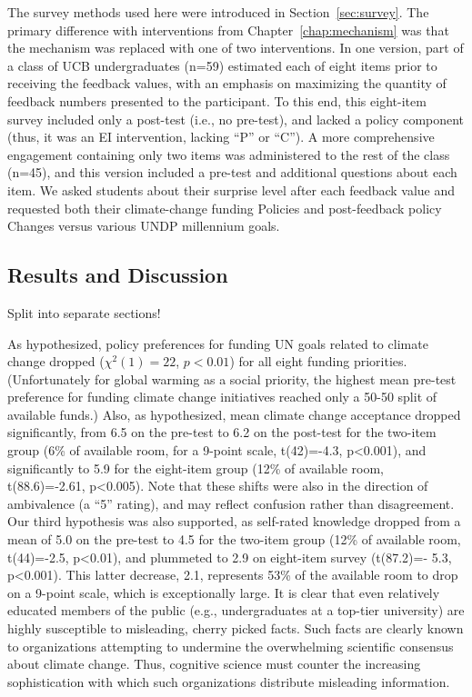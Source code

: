 The survey methods used here were introduced in Section~\ref{sec:survey}. The
primary difference with interventions from Chapter~\ref{chap:mechanism} was that
the mechanism was replaced with one of two interventions. In one version, part
of a class of UCB undergraduates (n=59) estimated each of eight items prior to
receiving the feedback values, with an emphasis on maximizing the quantity of
feedback numbers presented to the participant. To this end, this eight-item
survey included only a post-test (i.e., no pre-test), and lacked a policy
component (thus, it was an EI intervention, lacking ``P'' or ``C''). A more
comprehensive engagement containing only two items was administered to the rest
of the class (n=45), and this version included a pre-test and additional
questions about each item. We asked students about their surprise level after
each feedback value and requested both their climate-change funding Policies and
post-feedback policy Changes versus various UNDP millennium goals.

\subsection{Results and Discussion}

Split into separate sections! 

As hypothesized, policy preferences for funding UN goals
related to climate change dropped ($\chi^2(1)=22$, $p<0.01$) for all eight funding
priorities. (Unfortunately for global warming as a social priority, the highest
mean pre-test preference for funding climate change initiatives reached only a
50-50 split of available funds.) Also, as hypothesized, mean climate change
acceptance dropped significantly, from 6.5 on the pre-test to 6.2 on the
post-test for the two-item group (6\% of available room, for a 9-point scale,
t(42)=-4.3, p<0.001), and significantly to 5.9 for the eight-item group (12\% of
available room, t(88.6)=‑2.61, p<0.005). Note that these shifts were also in the
direction of ambivalence (a ``5'' rating), and may reflect confusion rather than
disagreement. Our third hypothesis was also supported, as self-rated knowledge
dropped from a mean of 5.0 on the pre-test to 4.5 for the two-item group (12\% of
available room, t(44)=-2.5, p<0.01), and plummeted to 2.9 on eight-item survey
(t(87.2)=- 5.3, p<0.001). This latter decrease, 2.1, represents 53\% of the
available room to drop on a 9-point scale, which is exceptionally large.  It is
clear that even relatively educated members of the public (e.g., undergraduates
at a top-tier university) are highly susceptible to misleading, cherry picked
facts. Such facts are clearly known to organizations attempting to undermine the
overwhelming scientific consensus about climate change. Thus, cognitive science
must counter the increasing sophistication with which such organizations
distribute misleading information.

